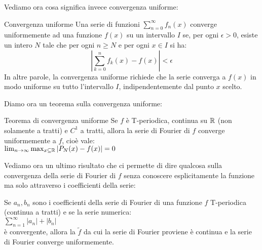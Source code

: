 Vediamo ora cosa significa invece convergenza uniforme:
\begin{definizione}{Convergenza uniforme}
  Una serie di funzioni $\sum_{n=0}^{\infty} f_n(x)$ converge uniformemente ad una funzione $f(x)$ su un intervallo $I$ se, per ogni $\epsilon > 0$, esiste un intero $N$ tale che per ogni $n \geq N$ e per ogni $x \in I$ si ha:
  $$
  \left| \sum_{k=0}^{n} f_k(x) - f(x) \right| < \epsilon
  $$
  In altre parole, la convergenza uniforme richiede che la serie converga a $f(x)$ in modo uniforme su tutto l'intervallo $I$, indipendentemente dal punto $x$ scelto.
\end{definizione}

Diamo ora un teorema sulla convergenza uniforme:
\begin{teorema}{Teorema di convergenza uniforme}
  Se $f$ è T-periodica, continua su $\mathbb{R}$ (non solamente a tratti) e $C^1$ a tratti, allora la serie di Fourier di $f$ converge uniformemente a $f$, cioè vale:\\
  $ \lim_{n \to \infty} \max_{x \subseteq \mathbb{R}} |P_N(x)-f(x)|=0$
\end{teorema}

Vediamo ora un ultimo risultato che ci permette di dire qualcosa sulla convergenza della serie di Fourier di $f$ senza conoscere esplicitamente la funzione ma solo attraverso i coefficienti della serie:
\begin{teorema}{}
  Se ${a_n,b_n}$ sono i coefficienti della serie di Fourier di una funzione $f$ T-periodica (continua a tratti) e se la serie numerica:\\
  $\sum_{n=1}^{\infty} |a_n|+|b_n|$\\
  è convergente, allora la $\tilde{f}$ da cui la serie di Fourier proviene è continua e la serie di Fourier converge uniformemente.
\end{teorema}
